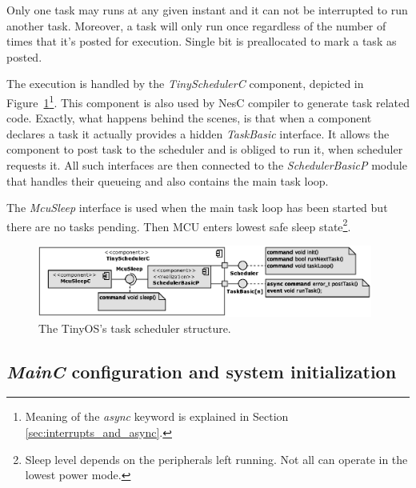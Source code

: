Only one task may runs at any given instant and it can not be
interrupted to run another task. Moreover, a task will only run once
regardless of the number of times that it's posted for execution.
Single bit is preallocated to mark a task as posted.

The execution is handled by the \emph{TinySchedulerC} component,
depicted in Figure~\ref{fig:tinyschedulerc}\footnote{Meaning of the
\emph{async} keyword is explained in Section
\ref{sec:interrupts_and_async}.}. This component is also used by NesC
compiler to generate task related code. Exactly, what happens behind
the scenes, is that when a component declares a task it actually
provides a hidden \emph{TaskBasic} interface. It allows the component
to post task to the scheduler and is obliged to run it, when scheduler
requests it.  All such interfaces are then connected to the
\emph{SchedulerBasicP} module that handles their queueing and also
contains the main task loop.

The \emph{McuSleep} interface is used when the main task loop has been
started but there are no tasks pending. Then MCU enters lowest safe
sleep state\footnote{Sleep level depends on the peripherals left
running. Not all can operate in the lowest power mode.}.

\begin{figure}[h]
  \centering
  \includegraphics[width=0.98\textwidth]{diagrams/tinyschedulerc.eps}
  \caption{The TinyOS's task scheduler structure.}
  \label{fig:tinyschedulerc}
\end{figure}

\subsection{\emph{MainC} configuration and system initialization}

